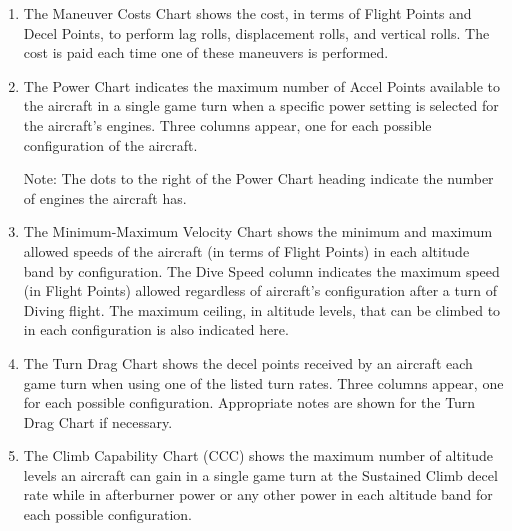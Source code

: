 \begin{enumerate}
    \item {} 
    The Maneuver Costs Chart shows the cost, in terms of Flight Points and Decel Points, to perform lag rolls, displacement rolls, and vertical rolls. The cost is paid each time one of these maneuvers is performed.

    \item {} 
    The Power Chart indicates the maximum number of Accel Points available to the aircraft in a single game turn when a specific power setting is selected for the aircraft's engines. Three columns appear, one for each possible configuration of the aircraft. 

    Note: The dots to the right of the Power Chart heading indicate the number of engines the aircraft has.

    \item {} 
    The Minimum-Maximum Velocity Chart shows the minimum and maximum allowed speeds of the aircraft (in terms of Flight Points) in each altitude band by configuration. The Dive Speed column indicates the maximum speed (in Flight Points) allowed regardless of aircraft's configuration after a turn of Diving flight. The maximum ceiling, in altitude levels, that can be climbed to in each configuration is also indicated here.

    \item {} 
    The Turn Drag Chart shows the decel points received by an aircraft each game turn when using one of the listed turn rates. Three columns appear, one for each possible configuration. Appropriate notes are shown for the Turn Drag Chart if necessary.

    \item {} 
    The Climb Capability Chart (CCC) shows the maximum number of altitude levels an aircraft can gain in a single game turn at the Sustained Climb decel rate while in afterburner power or any other power in each altitude band for each possible configuration.

\end{enumerate}

